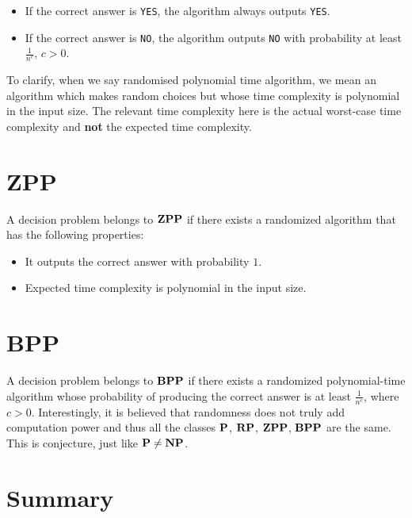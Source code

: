 \begin{itemize}
\item If the correct answer is \texttt{YES}, the algorithm always outputs \texttt{YES}.
\item If the correct answer is \texttt{NO}, the algorithm outputs \texttt{NO} with probability at 
least $\frac{1}{n^c}$, $c>0$.
\end{itemize}

To clarify, when we say randomised polynomial time algorithm, we mean an algorithm which makes 
random choices but whose time complexity is polynomial in the input size. The relevant time complexity here is 
the actual worst-case time complexity and \textbf{not} the expected time complexity.

\section{ZPP}
A decision problem belongs to $\mathbf{ZPP}$ if there exists a randomized algorithm that has the following properties:

\begin{itemize}
\item It outputs the correct answer with probability $1$.
\item Expected time complexity is polynomial in the input size.
\end{itemize}

\section{BPP}
A decision problem belongs to $\mathbf{BPP}$ if there exists a randomized polynomial-time algorithm 
whose probability of producing the correct answer is at least $\frac{1}{n^c}$, where $c>0$. 
Interestingly, it is believed that randomness does not truly add computation power and thus all the classes 
$\mathbf{P}$, $\mathbf{RP}$, $\mathbf{ZPP}$, $\mathbf{BPP}$ are the same. This is conjecture, just like $\mathbf{P} \neq \mathbf{NP}$.
\section{Summary}

